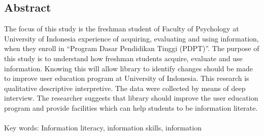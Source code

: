 %
%
%

\begin{singlespace} %
\chapter*{Abstract}


{
	The focus of this study is the freshman student of Faculty of Psychology at University of
	Indonesia experience of acquiring, evaluating and using information, when they enroll in
	“Program Dasar Pendidikan Tinggi (PDPT)”. The purpose of this study is to understand
	how freshman students acquire, evaluate and use information. Knowing this will allow
	library to identify changes should be made to improve user education program at
	University of Indonesia. This research is qualitative descriptive interpretive. The data
	were collected by means of deep interview. The researcher suggests that library should
	improve the user education program and provide facilities which can help students to be
	information literate. \\ \\
Key words:
	Information literacy, information skills, information
}
\end{singlespace}
\newpage